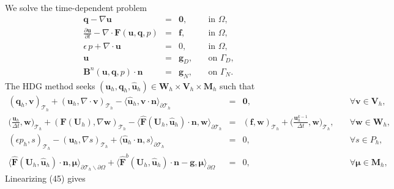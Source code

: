\documentclass[11pt]{article}
\begin{document}
We solve the time-dependent problem
\begin{equation}
\begin{array}{rcll}
\bm{q} - \nabla \bm{u}  & = & \bm{0} , & \quad \mbox{in } \Omega, \\
\displaystyle \frac{\partial \bm{u}}{\partial t} - \nabla \cdot \bm{F} (\bm{u},\bm{q},p) & = & \bm{f}, & \quad \mbox{in } \Omega, \\
\epsilon \, p + \nabla \cdot \bm{u}  & = & 0 , & \quad \mbox{in } \Omega, \\
\bm{u} & = & \bm{g}_D, & \quad \mbox{on } \Gamma_D , \\
\bm{B}^n(\bm{u},\bm{q},p) \cdot \bm{n} & = & \bm{g}_N, & \quad \mbox{on } \Gamma_N .
\end{array}
\end{equation}
The HDG method seeks $(\bm{u}_h,\bm{q}_h,\widehat{\bm{u}}_h) \in \bm{W}_h \times \bm{V}_h \times \bm{M}_h$ such that
\begin{equation}
\begin{array}{rcll}
(\bm{q}_h, \bm{v})_{\mathcal{T}_h} + (\bm{u}_h, \nabla \cdot \bm{v})_{\mathcal{T}_h} - \langle \widehat{\bm{u}}_h, \bm{v} \cdot \bm{n} \rangle_{\partial \mathcal{T}_h}  & = & \bm{0}, & \quad \forall \bm{v} \in \bm{V}_h, \\[2ex] 
\displaystyle \Big(\frac{\bm{u}_h}{\Delta t}, \bm{w} \Big)_{\mathcal{T}_h} + (\bm{F} (\bm{U}_h), \nabla \bm{w})_{\mathcal{T}_h} - \langle \widehat{\bm{F}} (\bm{U}_h,\widehat{\bm{u}}_h) \cdot \bm{n}, \bm{w} \rangle_{\partial \mathcal{T}_h} & = & (\bm{f}, \bm{w})_{\mathcal{T}_h} + \displaystyle \Big(\frac{\bm{u}_h^{k-1}}{\Delta t}, \bm{w} \Big)_{\mathcal{T}_h}, & \quad \forall \bm{w} \in \bm{W}_h, \\[2ex]
(\epsilon p_h, s)_{\mathcal{T}_h} - (\bm{u}_h, \nabla s)_{\mathcal{T}_h} + \langle \widehat{\bm{u}}_h \cdot \bm{n},s \rangle_{\partial \mathcal{T}_h}  & = & 0, & \quad \forall s \in P_h, \\[2ex] 
\langle \widehat{\bm{F}} (\bm{U}_h,\widehat{\bm{u}}_h) \cdot \bm{n}, \bm{\mu} \rangle_{\partial \mathcal{T}_h \backslash \partial \Omega} + \langle \widehat{\bm{F}}^b(\bm{U}_h,\widehat{\bm{u}}_h) \cdot \bm{n} - \bm{g}, \bm{\mu} \rangle_{\partial \Omega}  & = & 0, & \quad \forall \bm{\mu} \in \bm{M}_h ,
\end{array}
\end{equation}
Linearizing (45) gives
\end{document}
